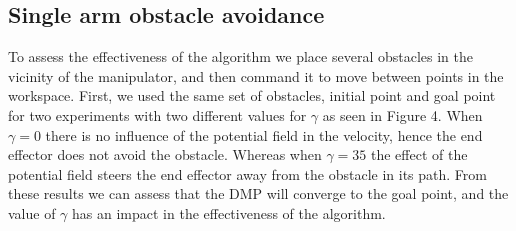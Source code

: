 \documentclass[a4paper, 10pt, conference]{ieeeconf}      %
\begin{document}
\subsection{Single arm obstacle avoidance} %
 To assess the effectiveness of the algorithm we place several obstacles in the vicinity of the manipulator, and then command it to move between points in the workspace. First, we used the same set of obstacles, initial point and goal point for two experiments with two different values for $\gamma$ as seen in Figure 4. When $\gamma=0$ there is no influence of the potential field in the velocity, hence the end effector does not avoid the obstacle. Whereas when $\gamma=35$ the effect of the potential field steers the end effector away from the obstacle in its path. From these results we can assess that the DMP will converge to the goal point, and the value of $\gamma$ has an impact in the effectiveness of the algorithm. 
\end{document}
